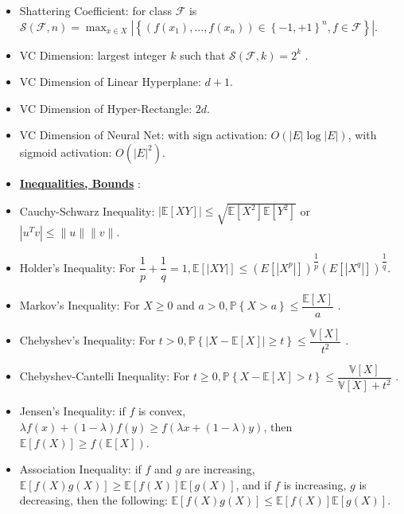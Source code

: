 \documentclass{article}
\begin{document}
\begin{itemize}
\item Shattering Coefficient: for class $\mathcal{F}$ is $\mathcal{S}\left(\mathcal{F}, n\right) = \displaystyle\max_{x \in X} |\left\{\left(f\left(x_{1}\right), ..., f\left(x_{n}\right)\right) \in \left\{-1, +1\right\}^{n}, f \in \mathcal{F}\right\}|$.
\item VC Dimension: largest integer $k $ such that $\mathcal{S}\left(\mathcal{F}, k\right) = 2^{k}$ .
\item VC Dimension of Linear Hyperplane: $d  + 1$.
\item VC Dimension of Hyper-Rectangle: $2 d. $
\item VC Dimension of Neural Net: with $\text{sign}$ activation: $O\left(|E| \log |E|\right) $, with sigmoid activation: $O\left(|E|^{2}\right) $.
\item \textbf{\underline{Inequalities, Bounds}} :
\item Cauchy-Schwarz Inequality: $| \mathbb{E}\left[X Y\right] | \leq  \sqrt{\mathbb{E}\left[X^{2}\right] \mathbb{E}\left[Y^{2}\right]}$ or $| u^{T} v | \leq  \| u \| \| v \|$.
\item Holder's Inequality: For $\dfrac{1}{p} + \dfrac{1}{q} = 1, \mathbb{E}\left[| X Y |\right] \leq  \left(E\left[|X^{p}|\right]\right)^{\dfrac{1}{p}} \left(E\left[|X^{q}|\right]\right)^{\dfrac{1}{q}}$.
\item Markov's Inequality: For $X  \geq  0$ and $a  > 0, \mathbb{P}\left\{X > a\right\} \leq  \dfrac{\mathbb{E}\left[X\right]}{a}$ .
\item Chebyshev's Inequality: For $t  > 0, \mathbb{P}\left\{| X - \mathbb{E}\left[X\right] | \geq  t\right\} \leq  \dfrac{\mathbb{V}\left[X\right]}{t^{2}}$ .
\item Chebyshev-Cantelli Inequality: For $t  \geq  0, \mathbb{P}\left\{X - \mathbb{E}\left[X\right] > t\right\} \leq  \dfrac{\mathbb{V}\left[X\right]}{\mathbb{V}\left[X\right] + t^{2}}$ .
\item Jensen's Inequality: if $f $ is convex, $\lambda f\left(x\right) + \left(1 - \lambda\right) f\left(y\right) \geq  f\left(\lambda x + \left(1 - \lambda\right) y\right)$, then $\mathbb{E}\left[f\left(X\right)\right] \geq  f\left(\mathbb{E}\left[X\right]\right)$.
\item Association Inequality: if $f $ and $g $ are increasing, $\mathbb{E}\left[f\left(X\right) g\left(X\right)\right] \geq  \mathbb{E}\left[f\left(X\right)\right] \mathbb{E}\left[g\left(X\right)\right]$, and if $f $ is increasing, $g $ is decreasing, then the following: $\mathbb{E}\left[f\left(X\right) g\left(X\right)\right] \leq  \mathbb{E}\left[f\left(X\right)\right] \mathbb{E}\left[g\left(X\right)\right]$.

\end{itemize}
\end{document}
